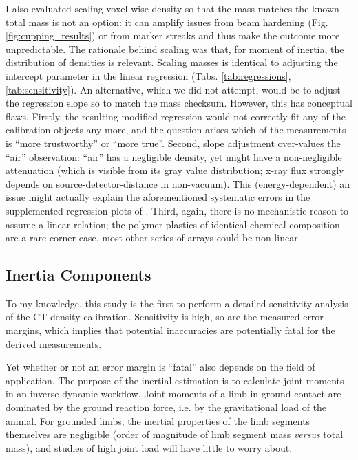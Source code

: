 I also evaluated scaling voxel-wise density so that the mass matches the known total mass is not an option: it can amplify issues from beam hardening (Fig. \ref{fig:cupping_results}) or from marker streaks and thus make the outcome more unpredictable.
The rationale behind scaling was that, for moment of inertia, the distribution of densities is relevant.
Scaling masses is identical to adjusting the intercept parameter in the linear regression (Tabs. \ref{tab:regressions}, \ref{tab:sensitivity}).
An alternative, which we did not attempt, would be to adjust the regression slope so to match the mass checksum.
However, this has conceptual flaws.
Firstly, the resulting modified regression would not correctly fit any of the calibration objects any more, and the question arises which of the measurements is ``more trustworthy'' or ``more true''.
Second, slope adjustment over-values the ``air'' observation: ``air'' has a negligible density, yet might have a non-negligible attenuation (which is visible from its gray value distribution; x-ray flux strongly depends on source-detector-distance in non-vacuum).
This (energy-dependent) air issue might actually explain the aforementioned systematic errors in the supplemented regression plots of \citet{Durston2022}.
Third, again, there is no mechanistic reason to assume a linear relation; the polymer plastics of identical chemical composition are a rare corner case, most other series of arrays could be non-linear.


\subsection{Inertia Components}
\label{sec:org52780f0}
To my knowledge, this study is the first to perform a detailed sensitivity analysis of the CT density calibration.
Sensitivity is high, so are the measured error margins, which implies that potential inaccuracies are potentially fatal for the derived measurements.

Yet whether or not an error margin is ``fatal'' also depends on the field of application.
The purpose of the inertial estimation is to calculate joint moments in an inverse dynamic workflow.
Joint moments of a limb in ground contact are dominated by the ground reaction force, i.e. by the gravitational load of the animal.
For grounded limbs, the inertial properties of the limb segments themselves are negligible (order of magnitude of limb segment mass \emph{versus} total mass), and studies of high joint load will have little to worry about.

